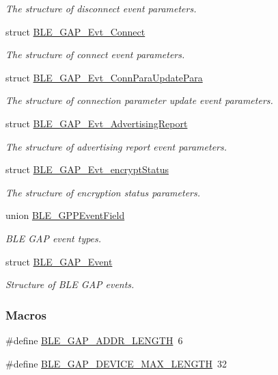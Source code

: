 \begin{DoxyCompactItemize}
\begin{DoxyCompactList}\small\item\em The structure of disconnect event parameters. \end{DoxyCompactList}\item 
struct \hyperlink{struct_b_l_e___g_a_p___evt___connect}{B\+L\+E\+\_\+\+G\+A\+P\+\_\+\+Evt\+\_\+\+Connect}
\begin{DoxyCompactList}\small\item\em The structure of connect event parameters. \end{DoxyCompactList}\item 
struct \hyperlink{struct_b_l_e___g_a_p___evt___conn_para_update_para}{B\+L\+E\+\_\+\+G\+A\+P\+\_\+\+Evt\+\_\+\+Conn\+Para\+Update\+Para}
\begin{DoxyCompactList}\small\item\em The structure of connection parameter update event parameters. \end{DoxyCompactList}\item 
struct \hyperlink{struct_b_l_e___g_a_p___evt___advertising_report}{B\+L\+E\+\_\+\+G\+A\+P\+\_\+\+Evt\+\_\+\+Advertising\+Report}
\begin{DoxyCompactList}\small\item\em The structure of advertising report event parameters. \end{DoxyCompactList}\item 
struct \hyperlink{struct_b_l_e___g_a_p___evt__encrypt_status}{B\+L\+E\+\_\+\+G\+A\+P\+\_\+\+Evt\+\_\+encrypt\+Status}
\begin{DoxyCompactList}\small\item\em The structure of encryption status parameters. \end{DoxyCompactList}\item 
union \hyperlink{union_b_l_e___g_p_p_event_field}{B\+L\+E\+\_\+\+G\+P\+P\+Event\+Field}
\begin{DoxyCompactList}\small\item\em B\+LE G\+AP event types. \end{DoxyCompactList}\item 
struct \hyperlink{struct_b_l_e___g_a_p___event}{B\+L\+E\+\_\+\+G\+A\+P\+\_\+\+Event}
\begin{DoxyCompactList}\small\item\em Structure of B\+LE G\+AP events. \end{DoxyCompactList}\end{DoxyCompactItemize}
\subsubsection*{Macros}
\begin{DoxyCompactItemize}
\item 
\#define \hyperlink{group___b_l_e___g_a_p_gac59af0a1a5d256432e9d01cdcd35215d}{B\+L\+E\+\_\+\+G\+A\+P\+\_\+\+A\+D\+D\+R\+\_\+\+L\+E\+N\+G\+TH}~6
\item 
\#define \hyperlink{group___b_l_e___g_a_p_ga78a44d2d04cdb689a4168c32c0657222}{B\+L\+E\+\_\+\+G\+A\+P\+\_\+\+D\+E\+V\+I\+C\+E\+\_\+\+M\+A\+X\+\_\+\+L\+E\+N\+G\+TH}~32
\end{DoxyCompactItemize}
